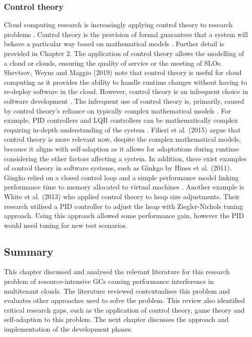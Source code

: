 \subsubsection{Control theory}
Cloud computing research is increasingly applying control theory
to research problems \cite{filieri2015software}. Control theory is the
provision of formal guarantees that a system will behave a particular
way based on mathematical models \cite{white2013control}.
Further detail is provided in Chapter 2. The application of control
theory allows the modelling of a cloud or clouds, ensuring the quality of
service or the meeting of SLOs. Shevtsov, Weyns and Maggio (2019) note that control theory is useful for cloud computing as it provides the ability to handle runtime changes without having to re-deploy software
in the cloud.
\newline\newline
However, control theory is an infrequent choice in software development \cite{shevtsov2019self}. The infrequent use of control theory is, primarily, caused by control theory's reliance on typically complex mathematical models \cite{andersson2009modeling}.  For
example, PID controllers and LQR controllers can be mathematically complex requiring in-depth understanding of the system \cite{white2013control}. Filieri et al. (2015) argue that control theory is more relevant now, despite the complex mathematical models, because it aligns with self-adaption as it allows for adaptations during runtime considering the other factors affecting a system. 
\newline\newline
In addition, there exist examples of control theory in software systems, such as Ginkgo by Hines et al. (2011). Gingko relied on a closed control loop and a simple performance model linking performance time to memory allocated to virtual machines \cite{hines2011applications}. Another example is White et al. (2013) who applied control theory to heap size adjustments. Their research utilised a PID controller to adjust the heap with Ziegler-Nichols tuning approach. Using this approach allowed some performance gain, however the PID would need tuning for new test scenarios.

\subsection{Summary}
This chapter discussed and analysed the relevant literature for this research problem of resource-intensive GCs causing performance interference in multitenant clouds. The literature reviewed contextualises this problem and evaluates other approaches used to solve the problem. This review also identified critical research gaps, such as the application of control theory, game theory and self-adaption to this problem. The next chapter discusses the approach and implementation of the development phases.
